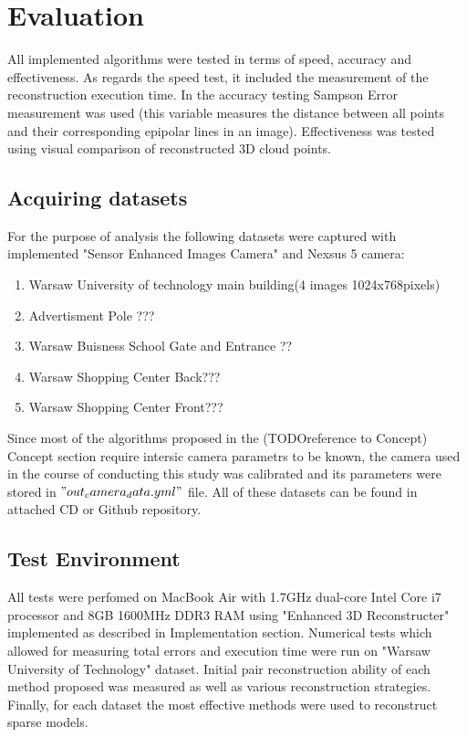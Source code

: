 
\ifpdf
    \graphicspath{{figures/}{figures/comparisons}}
\else
    \graphicspath{{figures/}{figures/comparisons}}
\fi


\chapter{Evaluation} %
All implemented algorithms were tested in terms of speed, accuracy and effectiveness. As regards the speed test, it included the measurement of the reconstruction execution time. In the accuracy testing Sampson Error measurement was used (this variable measures the distance between all points and their corresponding epipolar lines in an image). Effectiveness was tested using visual comparison of reconstructed 3D cloud points.
\section{Acquiring datasets}
For the purpose of analysis the following datasets were captured with implemented "Sensor Enhanced Images Camera" and Nexsus 5 camera:
\begin{enumerate}
\item Warsaw University of technology main building(4 images 1024x768pixels)
\item Advertisment Pole ??? 
\item Warsaw Buisness School Gate and Entrance ??
\item Warsaw Shopping Center Back???
\item Warsaw Shopping Center Front???
\end{enumerate}
Since most of the algorithms proposed in the (TODOreference to Concept) Concept section require intersic camera parametrs to be known, the camera used in the course of conducting this study was calibrated and its parameters were stored in $"out_camera_data.yml"$ file. All of these datasets can be found in attached CD or Github repository.
\section{Test Environment}
All tests were perfomed on MacBook Air with 1.7GHz dual-core Intel Core i7 processor and 8GB 1600MHz DDR3 RAM using "Enhanced 3D Reconstructer" implemented as described in Implementation section.  Numerical tests which allowed for measuring total errors and execution time were run on "Warsaw University of Technology" dataset. Initial pair reconstruction ability of each method proposed was measured as well as various reconstruction strategies.  Finally, for each dataset the most effective methods were used to reconstruct sparse models. 
